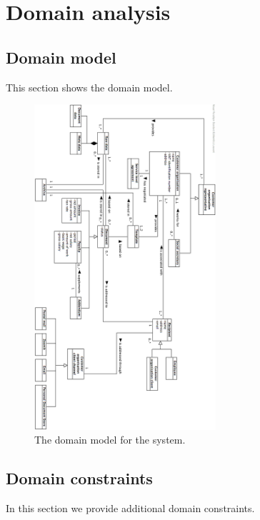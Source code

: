 \documentclass[a4paper,10pt]{article}
\begin{document}


\tableofcontents
\newpage

\section{Domain analysis}\label{sec:domain}
\subsection{Domain model}
This section shows the domain model.

\begin{figure}[h]
    \centering
	\includegraphics[width=0.6\textwidth]{eDocs_domain_model.png}
    \caption{The domain model for the system.}\label{fig:domain_model}
\end{figure}
\FloatBarrier
\subsection{Domain constraints}
In this section we provide additional domain constraints.
\end{document}
